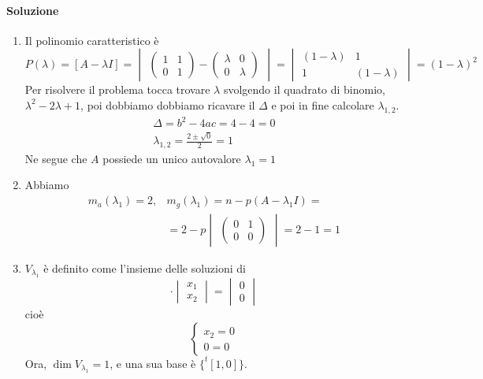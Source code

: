\paragraph{Soluzione}
\begin{enumerate}
\item Il polinomio caratteristico è
  \begin{equation*}
    P(\lambda)= [A-\lambda I] =
    \begin{vmatrix}
      \begin{pmatrix}
        1 & 1\\
        0 & 1
      \end{pmatrix}-
      \begin{pmatrix}
        \lambda & 0\\
        0 & \lambda
      \end{pmatrix}
    \end{vmatrix}=
    \begin{vmatrix}
      (1-\lambda) & 1 \\
      1 & (1-\lambda)
    \end{vmatrix}= (1-\lambda)^2
  \end{equation*}
Per risolvere il problema tocca trovare $\lambda$ svolgendo il quadrato di binomio, $\lambda^2-2\lambda+1$, poi dobbiamo dobbiamo ricavare il $\Delta$ e poi in fine calcolare $\lambda_{1,2}$.
\begin{eqnarray*}
  \Delta = b^2-4ac = 4 - 4 = 0\\
  \lambda_{1,2} = \frac{2\pm\sqrt{0}}{2}=1
\end{eqnarray*}
Ne segue che $A$ possiede un unico autovalore $\lambda_1=1$
\item Abbiamo
  \begin{eqnarray*}
    m_a(\lambda_1)=2, & m_g(\lambda_1)=n-p(A-\lambda_1I)=\\
    & = 2-p
      \begin{vmatrix}
        \begin{pmatrix}
          0 & 1 \\
          0 & 0
        \end{pmatrix}
      \end{vmatrix}= 2 - 1 = 1 
  \end{eqnarray*}
\item $V_{\lambda_1}$ è definito come l'insieme delle soluzioni di
  \begin{equation*}
    [A-\lambda_1I]\cdot\begin{vmatrix}
                         x_1\\
                         x_2
    \end{vmatrix}=
    \begin{vmatrix}
      0\\0
    \end{vmatrix}
  \end{equation*}
  cioè
  \begin{equation*}
    \begin{cases}
      x_2=0\\
      0=0
    \end{cases}
  \end{equation*}
  Ora, $\dim V_{\lambda_1}=1$, e una sua base è $\{^t[1,0]\}$.
\end{enumerate}
